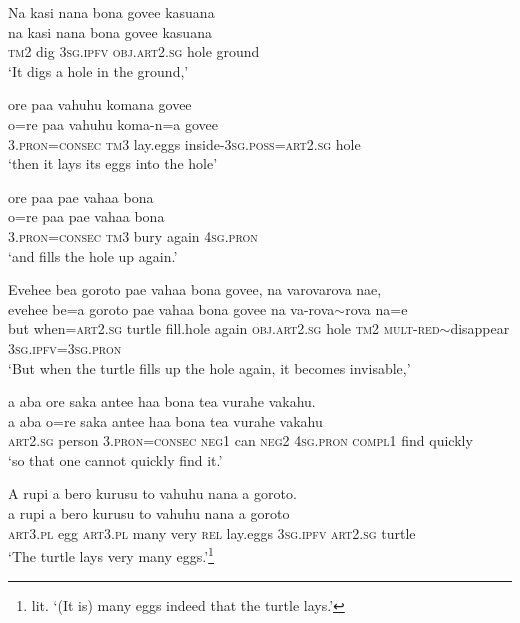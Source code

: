 \ea\label{ex:text19-11}
Na kasi nana bona govee kasuana\\
\gll na	kasi	nana	bona	govee	kasuana\\
     \textsc{tm}2	dig	3\textsc{sg}.\textsc{ipfv}	\textsc{obj}.\textsc{art}2.\textsc{sg}	hole	ground\\
\glt `It digs a hole in the ground,'
\z

\newpage
\ea\label{ex:text19-12}
ore paa vahuhu komana govee\\
\gll o=re	paa	vahuhu	koma-n=a	govee\\
     3.\textsc{pron}=\textsc{consec}	\textsc{tm}3	lay.eggs	inside-3\textsc{sg}.\textsc{poss}=\textsc{art}2.\textsc{sg}	hole\\
\glt `then it lays its eggs into the hole'
\z

\ea\label{ex:text19-13}
ore paa pae vahaa bona\\
\gll o=re	paa	pae	vahaa	bona\\
     3.\textsc{pron}=\textsc{consec}	\textsc{tm}3	bury	again	4\textsc{sg}.\textsc{pron}\\
\glt `and fills the hole up again.'
\z

\ea\label{ex:text19-14}
Evehee bea goroto pae vahaa bona govee, na varovarova nae,\\
\gll evehee	be=a	goroto	pae	vahaa	bona	govee	na	va-rova{$\sim$}rova	na=e\\
     but	when=\textsc{art}2.\textsc{sg}	turtle	fill.hole	again	\textsc{obj}.\textsc{art}2.\textsc{sg}	hole	\textsc{tm}2	\textsc{mult}-\textsc{red}{$\sim$}disappear	3\textsc{sg}.\textsc{ipfv}=3\textsc{sg}.\textsc{pron}\\
\glt `But when the turtle fills up the hole again, it becomes invisable,'
\z

\ea\label{ex:text19-15}
a aba ore saka antee haa bona tea vurahe vakahu.\\
\gll a	aba	o=re	saka	antee	haa	bona	tea	vurahe	vakahu\\
     \textsc{art}2.\textsc{sg}	person	3.\textsc{pron}=\textsc{consec}	\textsc{neg}1	can	\textsc{neg}2	4\textsc{sg}.\textsc{pron}	\textsc{compl}1	find	quickly\\
\glt `so that one cannot quickly find it.'
\z

\ea\label{ex:text19-16}
A rupi a bero kurusu to vahuhu nana a goroto.\\
\gll a	rupi	a	bero	kurusu	to	vahuhu	nana	a	goroto\\
     \textsc{art}3.\textsc{pl}	egg	\textsc{art}3.\textsc{pl}	many	very	\textsc{rel}	lay.eggs	3\textsc{sg}.\textsc{ipfv}	\textsc{art}2.\textsc{sg}	turtle\\
\glt `The turtle lays very many eggs.'\footnote{lit. `(It is) many eggs indeed that the turtle lays.'}
\z


